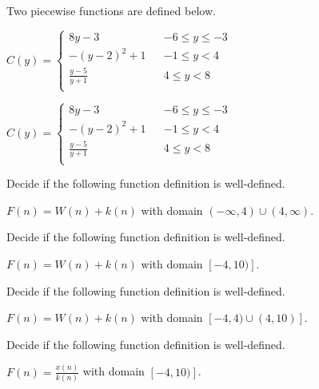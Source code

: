 \documentclass{ximera}
\begin{document}
\begin{definition}
Two piecewise functions are defined below.

$C(y) =   
\left \{ \begin{aligned}     
8 y - 3 && -6 \leq y \leq -3 \\        
-(y-2)^2 + 1 && -1 \leq y < 4 \\      
\frac{y-5}{y+1} && 4 \leq y < 8\\       
\end{aligned} \right .$ 




$C(y) =   
\left \{ \begin{aligned}     
8 y - 3 && -6 \leq y \leq -3 \\        
-(y-2)^2 + 1 && -1 \leq y < 4 \\      
\frac{y-5}{y+1} && 4 \leq y < 8\\       
\end{aligned} \right .$ 


\end{definition}





\begin{exercise}
Decide if the following function definition is well-defined.

$F(n) = W(n) + k(n)$ with domain $(-\infty, 4) \cup (4, \infty)$.

\begin{multipleChoice}
\end{multipleChoice}

\end{exercise}



\begin{exercise}
Decide if the following function definition is well-defined.

$F(n) = W(n) + k(n)$ with domain $[-4, 10)]$.

\begin{multipleChoice}
\end{multipleChoice}

\end{exercise}




\begin{exercise}
Decide if the following function definition is well-defined.

$F(n) = W(n) + k(n)$ with domain $[-4, 4) \cup (4, 10)]$.

\begin{multipleChoice}
\end{multipleChoice}

\end{exercise}





\begin{exercise}
Decide if the following function definition is well-defined.

$F(n) = \frac{x(n)}{k(n)}$ with domain $[-4, 10)]$.

\begin{multipleChoice}
\end{multipleChoice}

\end{exercise}
\end{document}
